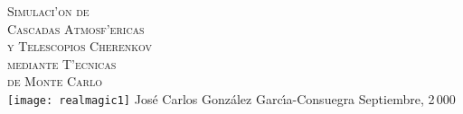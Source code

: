 %



\def\mititulo{%
Simulaci'on \\%
de Cascadas Atmosf'ericas \\%
y Telescopios Cherenkov \\%
mediante T'ecnicas \\%
de Monte Carlo\\}

\def\mititulogrande{%
Simulaci'on de \\%
Cascadas Atmosf'ericas \\%
y Telescopios Cherenkov \\%
mediante T'ecnicas \\%
de Monte Carlo\\}

\def\yo{Jos{\'{e}} Carlos Gonz{\'{a}}lez Garc{\'{\i}}a-Consuegra}


\thispagestyle{empty}  

\mbox{} \vskip 30pt

\begin{center}
  {\fontsize{30}{35}\selectfont \scshape \mititulogrande}
  \vskip 50pt
  {\centering \texttt{[image: realmagic1]}}
  \vskip 50pt
  {\huge \yo}
  \vskip 50pt
  {\LARGE Septiembre, 2\,000 \\} 
\end{center}

\echapter %

